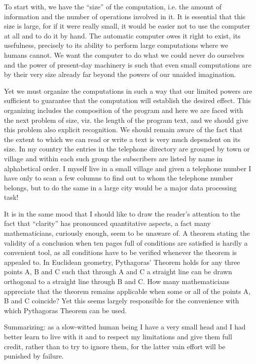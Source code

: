 To start with, we have the ``size'' of the computation, i.e. the 
amount of information and the number of operations involved in it. 
It is essential that this size is large, for if it were really 
small, it would be easier not to use the computer at all and to do 
it by hand. The automatic computer owes it right to exist, its 
usefulness, precisely to its ability to perform large computations
where we humans cannot. We want the computer to do what we could 
never do ourselves and the power of present-day machinery is such
that even small computations are by their very size already far 
beyond the powers of our unaided imagination.

Yet we must organize the computations in such a way that our limited 
powers are sufficient to guarantee that the computation will 
establish the desired effect. This organizing includes the
composition of the program and here we are faced with the next 
problem of size, viz. the length of the program text, and we should 
give this problem also explicit recognition. We should remain aware 
of the fact that the extent to which we can read or write a text is 
very much dependent on its size. In my country the entries in the 
telephone directory are grouped by town or village and within each 
such group the subscribers are listed by name in alphabetical
order. I myself live in a small village and given a telephone number 
I have only to scan a few columns to find out to whom the telephone 
number belongs, but to do the same in a large city would be a major 
data processing task!

It is in the same mood that I should like to draw the reader's 
attention to the fact that ``clarity'' has pronounced quantitative 
aspects, a fact many mathematicians, curiously enough, seem to be 
unaware of. A theorem stating the validity of a conclusion when ten 
pages full of conditions are satisfied is hardly a convenient tool, 
as all conditions have to be verified whenever the theorem is 
appealed to. In Euclidean geometry, Pythagoras' Theorem holds for any 
three points A, B and C such that through A and C a straight line can 
be drawn orthogonal to a straight line through B and C. How many 
mathematicians appreciate that the theorem remains applicable when 
some or all of the points A, B and C coincide? Yet this seems largely 
responsible for the convenience with which Pythagoras Theorem can be
used.

Summarizing: as a slow-witted human being I have a very small head 
and I had better learn to live with it and to respect my limitations 
and give them full credit, rather than to try to ignore them, for the 
latter vain effort will be punished by failure.